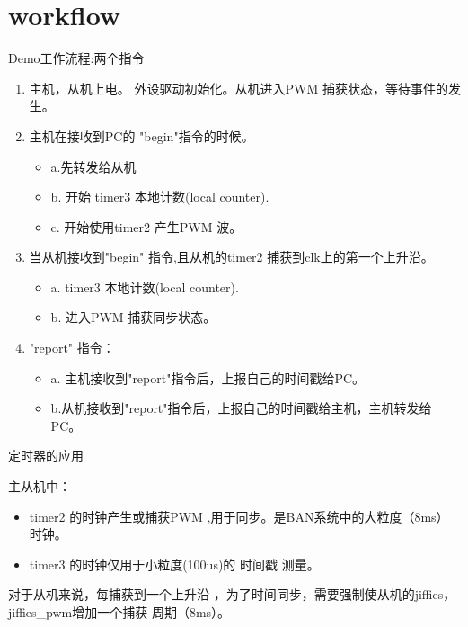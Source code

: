 \section{workflow}

\begin{frame}[fragile]{Demo工作流程:两个指令}

\begin{enumerate}
\item 主机，从机上电。 外设驱动初始化。从机进入PWM 捕获状态，等待事件的发生。
\item 主机在接收到PC的 "begin"指令的时候。
  \begin{itemize}
    \item a.先转发给从机
    \item b. 开始 timer3 本地计数(local counter).
    \item c. 开始使用timer2 产生PWM 波。
  \end{itemize}
\item 当从机接收到"begin" 指令,且从机的timer2 捕获到clk上的第一个上升沿。
  \begin{itemize}
    \item a.  timer3 本地计数(local counter).
    \item b. 进入PWM 捕获同步状态。
  \end{itemize}
\item "report" 指令：
\begin{itemize}
  \item a. 主机接收到"report"指令后，上报自己的时间戳给PC。
  \item b.从机接收到"report"指令后，上报自己的时间戳给主机，主机转发给PC。
\end{itemize}

\end{enumerate}


\end{frame}




\begin{frame}[fragile]{定时器的应用}

主从机中：
\begin{itemize}
  \item timer2 的时钟产生或捕获PWM ,用于同步。是BAN系统中的大粒度（8ms）时钟。
  \item timer3 的时钟仅用于小粒度(100us)的 时间戳 测量。
\end{itemize}


对于从机来说，每捕获到一个上升沿 ，为了时间同步，需要强制使从机的jiffies，jiffies\_pwm增加一个捕获
周期（8ms）。


\end{frame}




